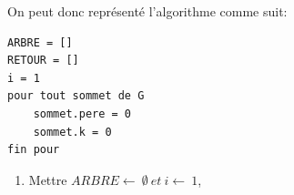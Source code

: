 On peut donc représenté l'algorithme comme suit:

%
%
%

\begin{verbatim}
ARBRE = []
RETOUR = []
i = 1
pour tout sommet de G
	sommet.pere = 0
	sommet.k = 0
fin pour

\end{verbatim}
\begin{enumerate}
	\item Mettre  $ARBRE \longleftarrow\ \emptyset\ et\ i\longleftarrow\ 1$, 
\end{enumerate}


 
 